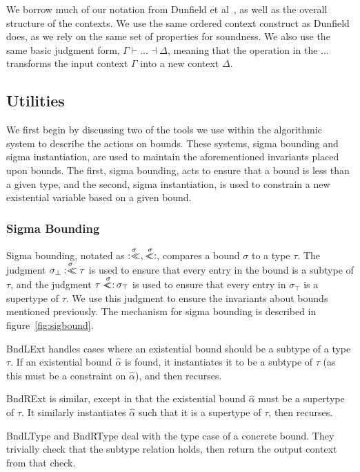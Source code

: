 \documentclass{sig-alternate}
\newcommand{\st}{\ensuremath{\hspace{-1px}<:\hspace{-1px}}}
\newcommand{\botbound}{\sigma_\bot}
\newcommand{\topbound}{\sigma_\top}
\newcommand{\sigbndl}{\overset{\sigma}{:<\hspace{-5px}<}}
\newcommand{\sigbndr}{\overset{\sigma}{<\hspace{-5px}\st}}
\begin{document}
We borrow much of our notation from Dunfield et al~\cite{Dunfield:2013:CEB:2544174.2500582}, as well as the overall structure of the contexts. We use the same ordered context construct as Dunfield does, as we rely on the same set of properties for soundness. We also use the same basic judgment form, $\Gamma \vdash \ldots \dashv \Delta$, meaning that the operation in the $\ldots$ transforms the input context $\Gamma$ into a new context $\Delta$.

\subsection{Utilities}

We first begin by discussing two of the tools we use within the algorithmic system to describe the actions on bounds. These systems, sigma bounding and sigma instantiation, are used to maintain the aforementioned invariants placed upon bounds. The first, sigma bounding, acts to ensure that a bound is less than a given type, and the second, sigma instantiation, is used to constrain a new existential variable based on a given bound.


\subsubsection{Sigma Bounding}
Sigma bounding, notated as $\sigbndl,\sigbndr$, compares a bound $\sigma$ to a type $\tau$. The judgment $\botbound \sigbndl \tau$ is used to ensure that every entry in the bound is a subtype of $\tau$, and the judgment $\tau \sigbndr \topbound$ is used to ensure that every entry in $\topbound$ is a supertype of $\tau$. We use this judgment to ensure the invariants about bounds mentioned previously. The mechanism for sigma bounding is described in figure~\ref{fig:sigbound}.

BndLExt handles cases where an existential bound should be a subtype of a type $\tau$. If an existential bound $\hat{\alpha}$ is found, it instantiates it to be a subtype of $\tau$ (as this must be a constraint on $\hat{\alpha}$), and then recurses.

BndRExt is similar, except in that the existential bound $\hat{\alpha}$ must be a supertype of $\tau$. It similarly instantiates $\hat{\alpha}$ such that it is a supertype of $\tau$, then recurses.

BndLType and BndRType deal with the type case of a concrete bound. They trivially check that the subtype relation holds, then return the output context from that check.
\end{document}
